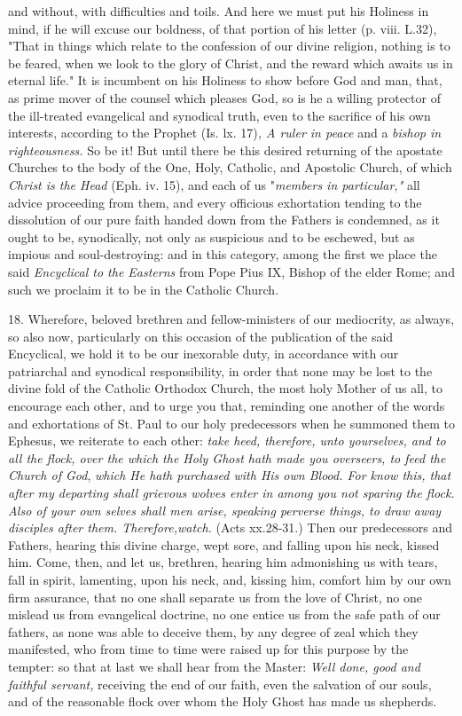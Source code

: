and without, with difficulties and toils. And here we must put his
Holiness in mind, if he will excuse our boldness, of that portion of his
letter (p. viii. L.32), "That in things which relate to the confession
of our divine religion, nothing is to be feared, when we look to the
glory of Christ, and the reward which awaits us in eternal life." It is
incumbent on his Holiness to show before God and man, that, as prime
mover of the counsel which pleases God, so is he a willing protector of
the ill-treated evangelical and synodical truth, even to the sacrifice
of his own interests, according to the Prophet (Is. lx. 17)\emph{, A
ruler in peace} and a \emph{bishop in righteousness.} So \emph{} be it!
But until there be this desired returning of the apostate Churches to
the body of the One, Holy, Catholic, and Apostolic Church, of which
\emph{Christ is the Head} (Eph. iv. 15), and each of us "\emph{members
in particular,"} all advice proceeding from them, and every officious
exhortation tending to the dissolution of our pure faith handed down
from the Fathers is condemned, as it ought to be, synodically, not only
as suspicious and to be eschewed, but as impious and soul-destroying:
and in this category, among the first we place the said \emph{Encyclical
to the Easterns} from Pope Pius IX, Bishop of the elder Rome; and such
we proclaim it to be in the Catholic Church.

18. Wherefore, beloved brethren and fellow-ministers of our mediocrity,
as always, so also now, particularly on this occasion of the publication
of the said Encyclical, we hold it to be our inexorable duty, in
accordance with our patriarchal and synodical responsibility, in order
that none may be lost to the divine fold of the Catholic Orthodox
Church, the most holy Mother of us all, to encourage each other, and to
urge you that, reminding one another of the words and exhortations of
St. Paul to our holy predecessors when he summoned them to Ephesus, we
reiterate to each other: \emph{take heed, therefore, unto yourselves,
and to all the flock, over the which the Holy Ghost hath made you
overseers, to feed the Church of God}, \emph{which He hath purchased
with His own Blood. For know this, that after my departing shall
grievous wolves enter in among you not sparing the flock. Also of your
own selves shall men arise, speaking perverse things, to draw away
disciples after them. Therefore,watch.} (Acts xx.28-31.) Then our
predecessors and Fathers, hearing this divine charge, wept sore, and
falling upon his neck, kissed him. Come, then, and let us, brethren,
hearing him admonishing us with tears, fall in spirit, lamenting, upon
his neck, and, kissing him, comfort him by our own firm assurance, that
no one shall separate us from the love of Christ, no one mislead us from
evangelical doctrine, no one entice us from the safe path of our
fathers, as none was able to deceive them, by any degree of zeal which
they manifested, who from time to time were raised up for this purpose
by the tempter: so that at last we shall hear from the Master:
\emph{Well done, good and faithful servant,} receiving the end of our
faith, even the salvation of our souls, and of the reasonable flock over
whom the Holy Ghost has made us shepherds.

